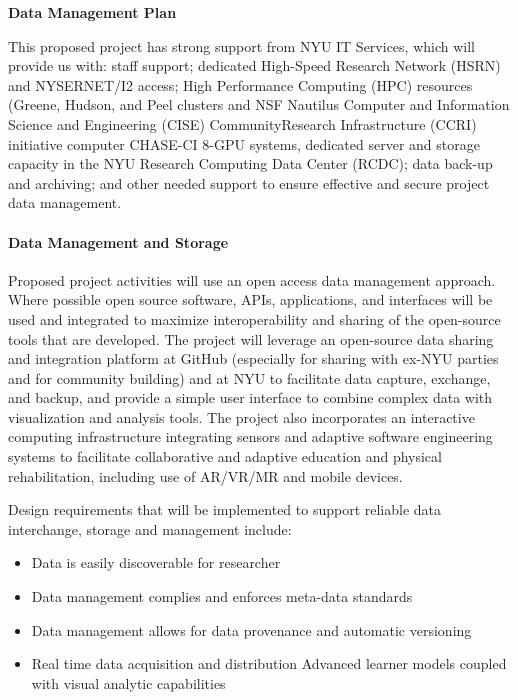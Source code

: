 \begin{center}
{\large \bf \TITLE}
\end{center}

\begin{center}
    {\bf Data Management Plan}
\end{center}


This proposed project has strong support from NYU IT Services, which will provide us with: staff support; dedicated High-Speed Research Network (HSRN) and NYSERNET/I2 access; High Performance Computing (HPC) resources (Greene, Hudson, and Peel clusters and NSF Nautilus Computer and Information Science and Engineering (CISE) CommunityResearch Infrastructure (CCRI) initiative computer CHASE-CI 8-GPU systems, dedicated server and storage capacity in the NYU Research Computing Data Center (RCDC); data back-up and archiving; and other needed support to ensure effective and secure project data management.

\paragraph{Data Management and Storage}
Proposed project activities will use an open access data management approach. Where possible open source software, APIs, applications, and interfaces will be used and integrated to maximize interoperability and sharing of the open-source tools that are developed. The project will leverage an open-source data sharing and integration platform at GitHub (especially for sharing with ex-NYU parties and for community building) and at NYU to facilitate data capture, exchange, and backup, and provide a simple user interface to combine complex data with visualization and analysis tools. The project also incorporates an interactive computing infrastructure integrating sensors and adaptive software engineering systems to facilitate collaborative and adaptive education and physical rehabilitation, including use of AR/VR/MR and mobile devices.

Design requirements that will be implemented to support reliable data interchange, storage and management include:

\begin{itemize}
    \item Data is easily discoverable for researcher
    \item Data management complies and enforces meta-data standards
    \item Data management allows for data provenance and automatic versioning
    \item Real time data acquisition and distribution
    Advanced learner models coupled with visual analytic capabilities
\end{itemize}

